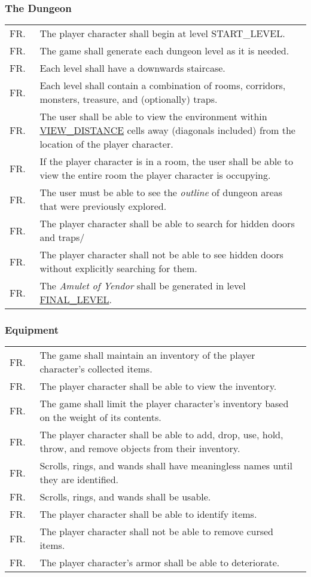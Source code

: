 \documentclass[12pt, titlepage]{article}
\newcounter{FRCounter}
\newcommand{\freq}[1]{
	\hfill\stepcounter{FRCounter}FR.\textbf{\theFRCounter}
	& #1
}
\begin{document}
		\subsubsection{The Dungeon}
			\begin{tabular}{p{0.1\linewidth}p{0.9\linewidth}}
				\freq{The player character shall begin at level START\_LEVEL.}\\
				\freq{The game shall generate each dungeon level as it is needed.}\\
				\freq{Each level shall have a downwards staircase.}\\
				\freq{Each level shall contain a combination of rooms, corridors, monsters, treasure, and (optionally) traps.}\\
				\freq{The user shall be able to view the environment within \hyperref[symbolicParameters]{VIEW\_DISTANCE} cells away (diagonals included) from the location of the player character.}\\
				\freq{If the player character is in a room, the user shall be able to view the entire room the player character is occupying.}\\
				\freq{The user must be able to see the \textit{outline} of dungeon areas that were previously explored.}\\
				\freq{The player character shall be able to search for hidden doors and traps/}\\
				\freq{The player character shall not be able to see hidden doors without explicitly searching for them.}\\
				\freq{The \textit{Amulet of Yendor} shall be generated in level \hyperref[symbolicParameters]{FINAL\_LEVEL}.}\\
			\end{tabular}

		\subsubsection{Equipment}
			\begin{tabular}{p{0.1\linewidth}p{0.9\linewidth}}
				\freq{The game shall maintain an inventory of the player character's collected items.}\\
				\freq{The player character shall be able to view the inventory.}\\
				\freq{The game shall limit the player character's inventory based on the weight of its contents.}\\
				\freq{The player character shall be able to add, drop, use, hold, throw, and remove objects from their inventory.}\\
				\freq{Scrolls, rings, and wands shall have meaningless names until they are identified.}\\
				\freq{Scrolls, rings, and wands shall be usable.}\\
				\freq{The player character shall be able to identify items.}\\
				\freq{The player character shall not be able to remove cursed items.}\\
				\freq{The player character's armor shall be able to deteriorate.}\\
			\end{tabular}
\end{document}
